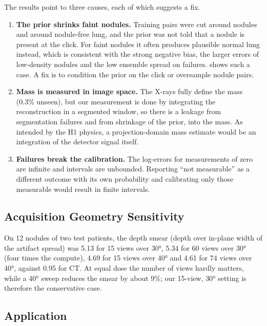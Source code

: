 The results point to three causes, each of which suggests a fix.
\begin{enumerate}
  \item \textbf{The prior shrinks faint nodules.} Training pairs were cut around nodules and around nodule-free lung, and the prior was not told that a nodule is present at the click. For faint nodules it often produces plausible normal lung instead, which is consistent with the strong negative bias, the larger errors of low-density nodules and the low ensemble spread on failures.  shows such a case. A fix is to condition the prior on the click or oversample nodule pairs.
  \item \textbf{Mass is measured in image space.} The X-rays fully define the mass (0.3\% unseen), but our measurement is done by integrating the reconstruction in a segmented window, so there is a leakage from segmentation failures and from shrinkage of the prior, into the mass. As intended by the H1 physics, a projection-domain mass estimate would be an integration of the detector signal itself.\item \textbf{Failures break the calibration.} The log-errors for measurements of zero are infinite and intervals are unbounded. Reporting ``not measurable'' as a different outcome with its own probability and calibrating only those measurable would result in finite intervals.
\end{enumerate}


\subsection{Acquisition Geometry Sensitivity}

On 12 nodules of two test patients, the depth smear (depth over in-plane width of the artifact spread) was 5.13 for 15 views over \ang{30}, 5.34 for 60 views over \ang{30} (four times the compute), 4.69 for 15 views over \ang{40} and 4.61 for 74 views over \ang{40}, against 0.95 for CT. At equal dose the number of views hardly matters, while a \ang{40} sweep reduces the smear by about 9\%; our 15-view, \ang{30} setting is therefore the conservative case.

\subsection{Application}

